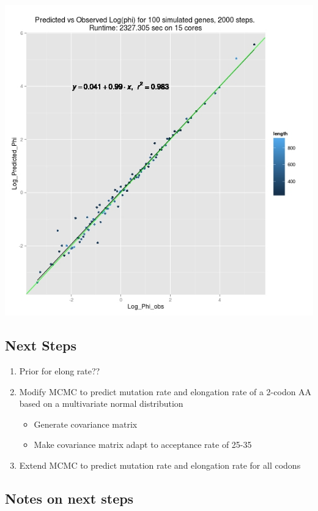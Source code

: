 \documentclass{article}
\begin{document}
 	\includegraphics[scale=0.4]{../chosen_100/genome_parms/elr_test_wo_phi_init_elr/Rplot01.jpeg}
 	
 	\subsection{Next Steps}
 	
 	\begin{enumerate}
 		\item Prior for elong rate??
 		\item Modify MCMC to predict mutation rate and elongation rate of a 2-codon AA based on a multivariate normal distribution
 		\begin{itemize}
 			\item Generate covariance matrix
 			\item Make covariance matrix adapt to acceptance rate of 25-35%
 		\end{itemize}
 		\item Extend MCMC to predict mutation rate and elongation rate for all codons
 	\end{enumerate}
\newpage
	\subsection{Notes on next steps}
	
\end{document}
